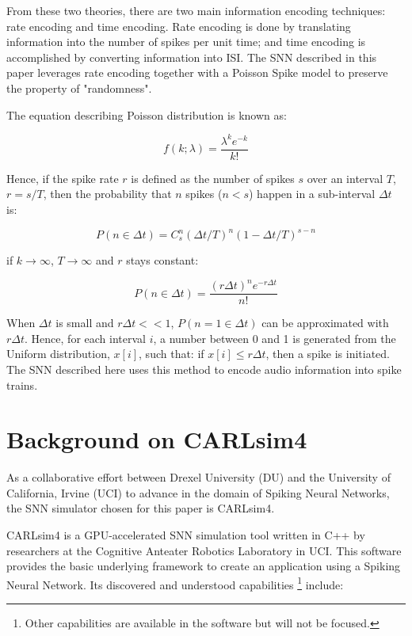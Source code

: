 \documentclass[11pt]{article}  %
\begin{document}
From these two theories, there are two main information encoding techniques: rate encoding and time encoding. Rate encoding is done by translating information into the number of spikes per unit time; and time encoding is accomplished by converting information into ISI. The SNN described in this paper leverages rate encoding together with a Poisson Spike model to preserve the property of "randomness".

The equation describing Poisson distribution is known as:

\begin{equation}
	f(k; \lambda) = \frac{\lambda^k e^{-k}}{k!}
	\label{eq3}
\end{equation}

Hence, if the spike rate $r$ is defined as the number of spikes $s$ over an interval $T$, $r = s/T$, then the probability that $n$ spikes ($n < s$) happen in a sub-interval $\Delta t$ is:
	
\begin{equation}
	P(n \in \Delta t) = C^n_s(\Delta t/T)^n(1- \Delta t/T)^{s-n}
	\label{eq4}
\end{equation}

if $k \rightarrow \infty$, $T \rightarrow \infty$ and $r$ stays constant:

\begin{equation}
	P(n \in \Delta t) = \frac{(r\Delta t)^n e^{-r\Delta t}}{n!}
	\label{eq5}
\end{equation}

When $\Delta t$ is small and $r\Delta t << 1$, $P(n=1 \in \Delta t)$ can be approximated with $r\Delta t$. Hence, for each interval $i$, a number between 0 and 1 is generated from the Uniform distribution, $x[i]$, such that: if $x[i] \le r\Delta t$, then a spike is initiated. The SNN described here uses this method to encode audio information into spike trains.

\section{Background on CARLsim4}
\label{bg_carlsim4}

As a collaborative effort between Drexel University (DU) and the University of California, Irvine (UCI) to advance in the domain of Spiking Neural Networks, the SNN simulator chosen for this paper is CARLsim4. 

CARLsim4 is a GPU-accelerated SNN simulation tool written in C++ by researchers at the Cognitive Anteater Robotics Laboratory in UCI. This software provides the basic underlying framework to create an application using a Spiking Neural Network. Its discovered and understood capabilities \footnote{Other capabilities are available in the software but will not be focused.} include:
\end{document}
